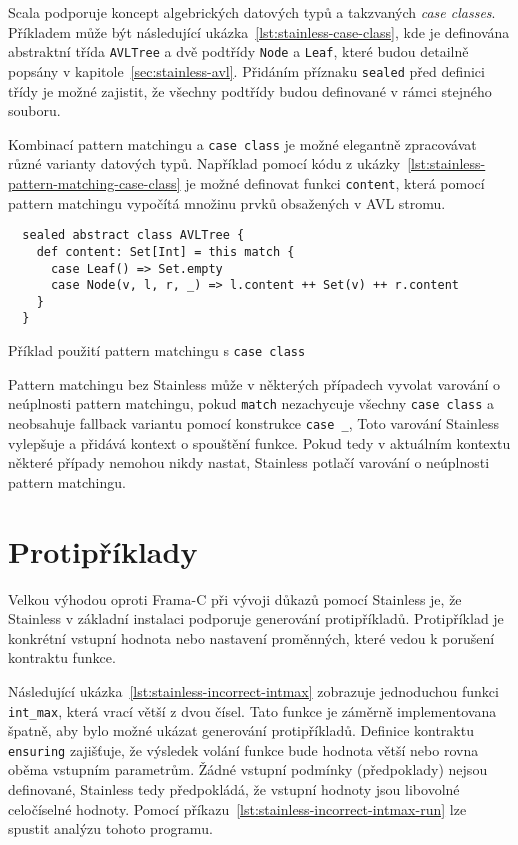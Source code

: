 Scala podporuje koncept algebrických datových typů
a takzvaných \textit{case classes}.
Příkladem může být následující ukázka~\ref{lst:stainless-case-class},
kde je definována abstraktní třída \texttt{AVLTree} a dvě podtřídy \texttt{Node} a \texttt{Leaf},
které budou detailně popsány v kapitole~\ref{sec:stainless-avl}.
Přidáním příznaku \texttt{sealed} před definici třídy
je možné zajistit, že všechny podtřídy budou definované v rámci stejného souboru.

Kombinací pattern matchingu a \texttt{case class} je možné elegantně zpracovávat různé varianty datových typů.
Například pomocí kódu z ukázky~\ref{lst:stainless-pattern-matching-case-class}
je možné definovat funkci \texttt{content},
která pomocí pattern matchingu vypočítá množinu prvků obsažených v AVL stromu.

\begin{listing}[H]
  \begin{verbatim}
  sealed abstract class AVLTree {
    def content: Set[Int] = this match {
      case Leaf() => Set.empty
      case Node(v, l, r, _) => l.content ++ Set(v) ++ r.content
    }
  }
  \end{verbatim}
  \caption{Příklad použití pattern matchingu s \texttt{case class}}
  \label{lst:stainless-pattern-matching-case-class}
\end{listing}

Pattern matchingu bez Stainless může v některých případech vyvolat
varování o neúplnosti pattern matchingu, pokud \texttt{match} nezachycuje všechny \texttt{case class}
a neobsahuje fallback variantu pomocí konstrukce \texttt{case \_},
Toto varování Stainless vylepšuje a přidává kontext o spouštění funkce.
Pokud tedy v aktuálním kontextu některé případy nemohou nikdy nastat,
Stainless potlačí varování o neúplnosti pattern matchingu.

\section{Protipříklady}
\label{sec:stainless-counterexamples}

Velkou výhodou oproti Frama\mbox{-}C při vývoji důkazů pomocí Stainless je,
že Stainless v základní instalaci podporuje generování protipříkladů.
Protipříklad je konkrétní vstupní hodnota nebo nastavení proměnných,
které vedou k porušení kontraktu funkce.

Následující ukázka~\ref{lst:stainless-incorrect-intmax} zobrazuje
jednoduchou funkci \texttt{int\_max}, která vrací větší z dvou čísel.
Tato funkce je záměrně implementovana špatně,
aby bylo možné ukázat generování protipříkladů.
Definice kontraktu \texttt{ensuring} zajišťuje,
že výsledek volání funkce bude hodnota větší nebo rovna oběma vstupním parametrům.
Žádné vstupní podmínky (předpoklady) nejsou definované,
Stainless tedy předpokládá, že vstupní hodnoty jsou libovolné celočíselné hodnoty.
Pomocí příkazu~\ref{lst:stainless-incorrect-intmax-run}
lze spustit analýzu tohoto programu.

